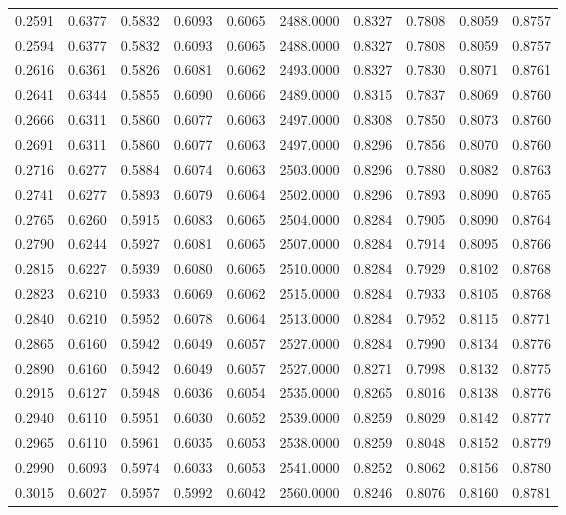 \begin{tabular}{rrrrrrrrrr}
0.2591 & 0.6377 & 0.5832 & 0.6093 & 0.6065 & 2488.0000 & 0.8327 & 0.7808 & 0.8059 & 0.8757 \\
0.2594 & 0.6377 & 0.5832 & 0.6093 & 0.6065 & 2488.0000 & 0.8327 & 0.7808 & 0.8059 & 0.8757 \\
0.2616 & 0.6361 & 0.5826 & 0.6081 & 0.6062 & 2493.0000 & 0.8327 & 0.7830 & 0.8071 & 0.8761 \\
0.2641 & 0.6344 & 0.5855 & 0.6090 & 0.6066 & 2489.0000 & 0.8315 & 0.7837 & 0.8069 & 0.8760 \\
0.2666 & 0.6311 & 0.5860 & 0.6077 & 0.6063 & 2497.0000 & 0.8308 & 0.7850 & 0.8073 & 0.8760 \\
0.2691 & 0.6311 & 0.5860 & 0.6077 & 0.6063 & 2497.0000 & 0.8296 & 0.7856 & 0.8070 & 0.8760 \\
0.2716 & 0.6277 & 0.5884 & 0.6074 & 0.6063 & 2503.0000 & 0.8296 & 0.7880 & 0.8082 & 0.8763 \\
0.2741 & 0.6277 & 0.5893 & 0.6079 & 0.6064 & 2502.0000 & 0.8296 & 0.7893 & 0.8090 & 0.8765 \\
0.2765 & 0.6260 & 0.5915 & 0.6083 & 0.6065 & 2504.0000 & 0.8284 & 0.7905 & 0.8090 & 0.8764 \\
0.2790 & 0.6244 & 0.5927 & 0.6081 & 0.6065 & 2507.0000 & 0.8284 & 0.7914 & 0.8095 & 0.8766 \\
0.2815 & 0.6227 & 0.5939 & 0.6080 & 0.6065 & 2510.0000 & 0.8284 & 0.7929 & 0.8102 & 0.8768 \\
0.2823 & 0.6210 & 0.5933 & 0.6069 & 0.6062 & 2515.0000 & 0.8284 & 0.7933 & 0.8105 & 0.8768 \\
0.2840 & 0.6210 & 0.5952 & 0.6078 & 0.6064 & 2513.0000 & 0.8284 & 0.7952 & 0.8115 & 0.8771 \\
0.2865 & 0.6160 & 0.5942 & 0.6049 & 0.6057 & 2527.0000 & 0.8284 & 0.7990 & 0.8134 & 0.8776 \\
0.2890 & 0.6160 & 0.5942 & 0.6049 & 0.6057 & 2527.0000 & 0.8271 & 0.7998 & 0.8132 & 0.8775 \\
0.2915 & 0.6127 & 0.5948 & 0.6036 & 0.6054 & 2535.0000 & 0.8265 & 0.8016 & 0.8138 & 0.8776 \\
0.2940 & 0.6110 & 0.5951 & 0.6030 & 0.6052 & 2539.0000 & 0.8259 & 0.8029 & 0.8142 & 0.8777 \\
0.2965 & 0.6110 & 0.5961 & 0.6035 & 0.6053 & 2538.0000 & 0.8259 & 0.8048 & 0.8152 & 0.8779 \\
0.2990 & 0.6093 & 0.5974 & 0.6033 & 0.6053 & 2541.0000 & 0.8252 & 0.8062 & 0.8156 & 0.8780 \\
0.3015 & 0.6027 & 0.5957 & 0.5992 & 0.6042 & 2560.0000 & 0.8246 & 0.8076 & 0.8160 & 0.8781 \\

\end{tabular}
